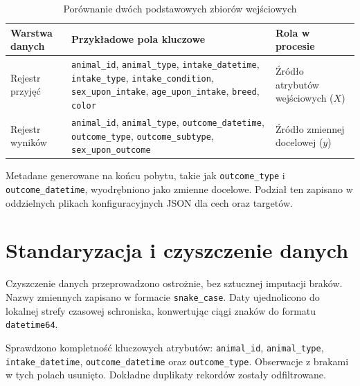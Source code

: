 \begin{table}[htbp]
\centering
\caption{Porównanie dwóch podstawowych zbiorów wejściowych}
\label{tab:porownanie-zbiorow-wejsciowych}
\small
\begin{tabular}{|p{}|p{}|p{}|}
\hline
\rowcolor{LightGray}
\textbf{Warstwa danych} & \textbf{Przykładowe pola kluczowe} & \textbf{Rola w procesie} \\
\hline
Rejestr przyjęć & \texttt{animal\_id}, \texttt{animal\_type}, \texttt{intake\_datetime}, \texttt{intake\_type}, \texttt{intake\_condition}, \texttt{sex\_upon\_intake}, \texttt{age\_upon\_intake}, \texttt{breed}, \texttt{color} & Źródło atrybutów wejściowych ($X$) \\
\hline
Rejestr wyników & \texttt{animal\_id}, \texttt{animal\_type}, \texttt{outcome\_datetime}, \texttt{outcome\_type}, \texttt{outcome\_subtype}, \texttt{sex\_upon\_outcome} & Źródło zmiennej docelowej ($y$) \\
\hline
\end{tabular}
\end{table}

Metadane generowane na końcu pobytu, takie jak \texttt{outcome\_type} i \texttt{outcome\_datetime}, wyodrębniono jako zmienne docelowe. Podział ten zapisano w oddzielnych plikach konfiguracyjnych JSON dla cech oraz targetów.

\section{Standaryzacja i czyszczenie danych}
\label{sec:standaryzacja-czyszczenie}

Czyszczenie danych przeprowadzono ostrożnie, bez sztucznej imputacji braków. Nazwy zmiennych zapisano w formacie \texttt{snake\_case}. Daty ujednolicono do lokalnej strefy czasowej schroniska, konwertując ciągi znaków do formatu \texttt{datetime64}.

Sprawdzono kompletność kluczowych atrybutów: \texttt{animal\_id}, \texttt{animal\_type}, \texttt{intake\_datetime}, \texttt{outcome\_datetime} oraz \texttt{outcome\_type}. Obserwacje z brakami w tych polach usunięto. Dokładne duplikaty rekordów zostały odfiltrowane.

